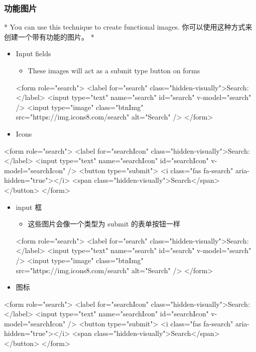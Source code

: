 \begin{paracol}{2}
\subsubsection{功能图片}
\switchcolumn[0]*%
You can use this technique to create functional images.
\switchcolumn
你可以使用这种方式来创建一个带有功能的图片。
\switchcolumn[0]*%
\begin{itemize}
\item
  Input fields
  \begin{itemize}
  \item
    These images will act as a submit type button on forms
  \end{itemize}
\begin{codeHtml}
<form role="search">
  <label for="search" class="hidden-visually">Search: </label>
  <input type="text" name="search" id="search" v-model="search" />
  <input
    type="image"
    class="btnImg"
    src="https://img.icons8.com/search"
    alt="Search"
  />
</form>
\end{codeHtml}
\item
  Icons
\end{itemize}
\begin{codeHtml}
<form role="search">
  <label for="searchIcon" class="hidden-visually">Search: </label>
  <input type="text" name="searchIcon" id="searchIcon" v-model="searchIcon" />
  <button type="submit">
    <i class="fas fa-search" aria-hidden="true"></i>
    <span class="hidden-visually">Search</span>
  </button>
</form>
\end{codeHtml}
\switchcolumn
\begin{itemize}
\item
  input 框
  \begin{itemize}
  \item
    这些图片会像一个类型为 submit 的表单按钮一样
  \end{itemize}
\begin{codeHtml}
<form role="search">
  <label for="search" class="hidden-visually">Search: </label>
  <input type="text" name="search" id="search" v-model="search" />
  <input
    type="image"
    class="btnImg"
    src="https://img.icons8.com/search"
    alt="Search"
  />
</form>
\end{codeHtml}
\item
  图标
\end{itemize}
\begin{codeHtml}
<form role="search">
  <label for="searchIcon" class="hidden-visually">Search: </label>
  <input type="text" name="searchIcon" id="searchIcon" v-model="searchIcon" />
  <button type="submit">
    <i class="fas fa-search" aria-hidden="true"></i>
    <span class="hidden-visually">Search</span>
  </button>
</form>
\end{codeHtml}
\end{paracol}



